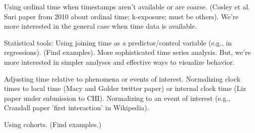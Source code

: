 Using ordinal time when timestamps aren't available or are coarse. (Cosley et al. Suri paper from 2010 about ordinal time; k-exposure; must be others).  We're more interested in the general case when time data is available.  

Statistical tools: Using joining time as a predictor/control variable (e.g., in regressions).  (Find examples).  
More sophisticated time series analysis.  But, we're more interested in simpler analyses and effective ways to visualize behavior.

Adjusting time relative to phenomena or events of interest.  Normalizing clock times to local time (Macy and Golder twitter paper) or internal clock time (Liz paper under submission to CHI).  Normalizing to an event of interest (e.g., Crandall paper 'first interaction' in Wikipedia).  

Using cohorts.  (Find examples.)




